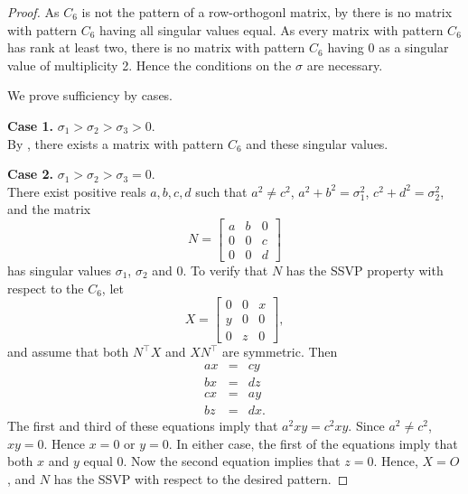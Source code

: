 \documentclass[10pt,a4paper]{amsart}
\newcommand{\trans  }{^\top}
\begin{document}
\begin{proof}
As $C_6$ is not the pattern of a row-orthogonl matrix,
by  there is no matrix with pattern $C_6$
having all singular values equal. As every matrix with pattern $C_6$ has rank at least two, there is no matrix with pattern $C_6$ having $0$ as a singular value of multiplicity 2.  Hence the conditions on the $\sigma$ are necessary. 

\bigskip\noindent
We prove sufficiency by cases.

\bigskip\noindent
{\bf Case 1.} $ \sigma_1>\sigma_2> \sigma_3>0$. 
\\ 
By , there exists a matrix with pattern $C_6$ and these singular values.

\bigskip\noindent
{\bf Case 2.} $ \sigma_1>\sigma_2> \sigma_3=0$. 
\\ 
There exist positive reals $a, b, c, d$ such that 
 $a^2 \neq c^2$, $a^2+ b^2=\sigma_1^2$, $c^2+d^2=\sigma_2^2$, and  
the matrix 
\[ 
N= \left[ \begin{array}{ccc}
a & b & 0 \\
0 & 0 & c \\
0 & 0 & d 
\end{array}
\right] 
\]
has singular values $\sigma_1$, $\sigma_2$ and $0$. 
To verify that  $N$ has the SSVP property with respect 
to the $C_6$,
let 
\[ 
X=\left[\begin{array}{ccc}
0& 0 & x\\ 
y & 0 & 0\\
0 & z & 0
\end{array} 
\right],
\]
and assume that both $N\trans X$ and $X N\trans$ are symmetric. 
Then 
\begin{eqnarray*}
ax&=&cy\\ 
bx&=&dz\\ 
cx&=&ay\\
bz&=&dx.
\end{eqnarray*}
The first and third of these equations imply that $a^2xy=c^2xy$.
Since $a^2\neq c^2$, $xy=0$. Hence $x=0$ or $y=0$. In either case, 
the first of the equations imply that both $x$ and $y$ equal $0$. 
Now the second equation implies that $z=0$.  Hence, $X=O$, and 
$N$ has the SSVP with respect to the desired pattern. 



\end{proof}
\end{document}
